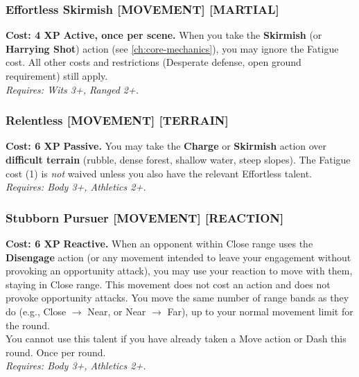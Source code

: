 \subsubsection*{Effortless Skirmish \textnormal{[MOVEMENT] [MARTIAL]}}
\label{talent:effortless-skirmish}
\textbf{Cost: 4 XP} \textbf{Active, once per scene.} When you take the \textbf{Skirmish} (or \textbf{Harrying Shot}) action (see \ref{ch:core-mechanics}), you may ignore the Fatigue cost. All other costs and restrictions (Desperate defense, open ground requirement) still apply. \\
\textit{Requires: Wits 3+, Ranged 2+.}

\subsubsection*{Relentless \textnormal{[MOVEMENT] [TERRAIN]}}
\label{talent:relentless}
\textbf{Cost: 6 XP} \textbf{Passive.} You may take the \textbf{Charge} or \textbf{Skirmish} action over \textbf{difficult terrain} (rubble, dense forest, shallow water, steep slopes). The Fatigue cost (1) is \emph{not} waived unless you also have the relevant Effortless talent. \\
\textit{Requires: Body 3+, Athletics 2+.}

\subsubsection*{Stubborn Pursuer \textnormal{[MOVEMENT] [REACTION]}}
\label{talent:stubborn-pursuer}
\textbf{Cost: 6 XP} \textbf{Reactive.} When an opponent within Close range uses the \textbf{Disengage} action (or any movement intended to leave your engagement without provoking an opportunity attack), you may use your reaction to move with them, staying in Close range. This movement does not cost an action and does not provoke opportunity attacks. You move the same number of range bands as they do (e.g., Close $\rightarrow$ Near, or Near $\rightarrow$ Far), up to your normal movement limit for the round. \\
You cannot use this talent if you have already taken a Move action or Dash this round. Once per round. \\
\textit{Requires: Body 3+, Athletics 2+.}

